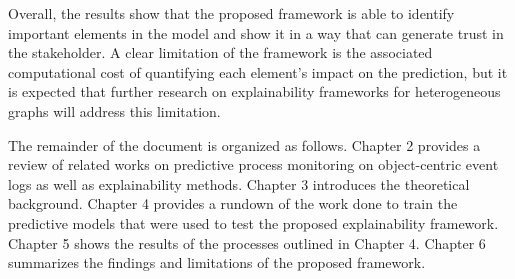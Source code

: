 Overall, the results show that the proposed framework is able to identify important elements in the model and show it in a way that can generate trust in the stakeholder. A clear limitation of the framework is the associated computational cost of quantifying each element's impact on the prediction, but it is expected that further research on explainability frameworks for heterogeneous graphs will address this limitation.

The remainder of the document is organized as follows. Chapter 2 provides a review of related works on predictive process monitoring on object-centric event logs as well as explainability methods. Chapter 3 introduces the theoretical background. Chapter 4 provides a rundown of the work done to train the predictive models that were used to test the proposed explainability framework. Chapter 5 shows the results of the processes outlined in Chapter 4. Chapter 6 summarizes the findings and limitations of the proposed framework.